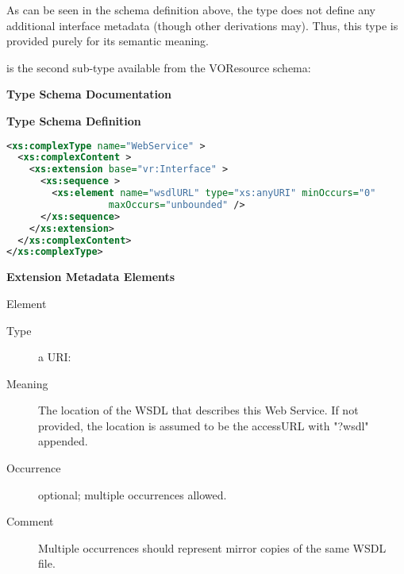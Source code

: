 \documentclass[11pt,a4paper]{ivoa}
\begin{document}


As can be seen in the schema definition above, the
 type does not define any additional
interface metadata (though other  derivations
may).  Thus, this type is provided purely for its semantic meaning.  



 is the second 
sub-type available from the VOResource schema:

\begin{generated}
\begingroup
      	\renewcommand*\descriptionlabel[1]{%
      	\hbox to 5.5em{\emph{#1}\hfil}}\vspace{2ex}\noindent\textbf{ Type Schema Documentation}



\vspace{1ex}\noindent\textbf{ Type Schema Definition}

\begin{lstlisting}[language=XML,basicstyle=\footnotesize]
<xs:complexType name="WebService" >
  <xs:complexContent >
    <xs:extension base="vr:Interface" >
      <xs:sequence >
        <xs:element name="wsdlURL" type="xs:anyURI" minOccurs="0"
                  maxOccurs="unbounded" />
      </xs:sequence>
    </xs:extension>
  </xs:complexContent>
</xs:complexType>
\end{lstlisting}

\vspace{0.5ex}\noindent\textbf{ Extension Metadata Elements}

\begingroup\small\begin{bigdescription}\item[Element \xmlel{wsdlURL}]
\begin{description}
\item[Type] a URI: 
\item[Meaning] 
                        The location of the WSDL that describes this
                        Web Service.  If not provided, the location is 
                        assumed to be the accessURL with {"}?wsdl{"} appended.
                     
\item[Occurrence] optional; multiple occurrences allowed.
\item[Comment] 
                        Multiple occurrences should represent mirror copies of 
                        the same WSDL file.  
                     

\end{description}


\end{bigdescription}\endgroup

\endgroup
\end{generated}
\end{document}
